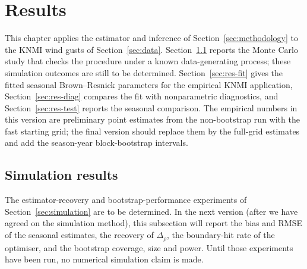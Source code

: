 \section{Results}\label{sec:results}

This chapter applies the estimator and inference of Section~\ref{sec:methodology} to the KNMI wind gusts of Section~\ref{sec:data}. Section~\ref{sec:res-sim} reports the Monte Carlo study that checks the procedure under a known data-generating process; these simulation outcomes are still to be determined. Section~\ref{sec:res-fit} gives the fitted seasonal Brown--Resnick parameters for the empirical KNMI application, Section~\ref{sec:res-diag} compares the fit with nonparametric diagnostics, and Section~\ref{sec:res-test} reports the seasonal comparison. The empirical numbers in this version are preliminary point estimates from the non-bootstrap run with the fast starting grid; the final version should replace them by the full-grid estimates and add the season-year block-bootstrap intervals.

\subsection{Simulation results}\label{sec:res-sim}

The estimator-recovery and bootstrap-performance experiments of Section~\ref{sec:simulation} are to be determined. In the next version (after we have agreed on the simulation method), this subsection will report the bias and RMSE of the seasonal estimates, the recovery of \(\Delta_\rho\), the boundary-hit rate of the optimiser, and the bootstrap coverage, size and power. Until those experiments have been run, no numerical simulation claim is made.

